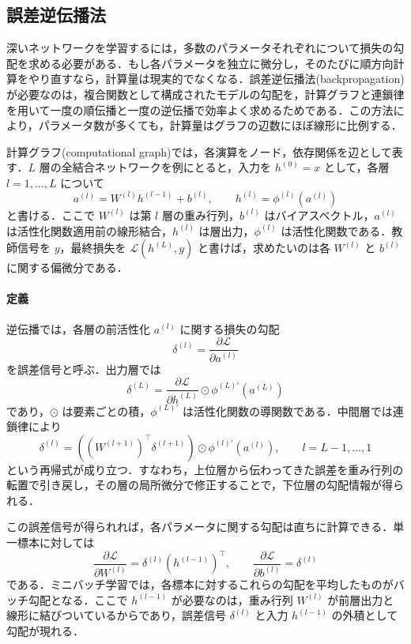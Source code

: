 \subsection{誤差逆伝播法}
深いネットワークを学習するには，多数のパラメータそれぞれについて損失の勾配を求める必要がある．もし各パラメータを独立に微分し，そのたびに順方向計算をやり直すなら，計算量は現実的でなくなる．誤差逆伝播法(backpropagation)\cite{Rumelhart1986}が必要なのは，複合関数として構成されたモデルの勾配を，計算グラフと連鎖律を用いて一度の順伝播と一度の逆伝播で効率よく求めるためである．この方法により，パラメータ数が多くても，計算量はグラフの辺数にほぼ線形に比例する．

計算グラフ(computational graph)では，各演算をノード，依存関係を辺として表す．$L$ 層の全結合ネットワークを例にとると，入力を $h^{(0)}=x$ として，各層 $l=1,\dots,L$ について
\begin{equation}
a^{(l)} = W^{(l)} h^{(l-1)} + b^{(l)},
\qquad
h^{(l)} = \phi^{(l)}(a^{(l)})
\end{equation}
と書ける．ここで $W^{(l)}$ は第 $l$ 層の重み行列，$b^{(l)}$ はバイアスベクトル，$a^{(l)}$ は活性化関数適用前の線形結合，$h^{(l)}$ は層出力，$\phi^{(l)}$ は活性化関数である．教師信号を $y$，最終損失を $\mathcal L(h^{(L)},y)$ と書けば，求めたいのは各 $W^{(l)}$ と $b^{(l)}$ に関する偏微分である．

\paragraph*{定義}
逆伝播では，各層の前活性化 $a^{(l)}$ に関する損失の勾配
\begin{equation}
\delta^{(l)} = \frac{\partial \mathcal L}{\partial a^{(l)}}
\end{equation}
を誤差信号と呼ぶ．出力層では
\begin{equation}
\delta^{(L)}
= \frac{\partial \mathcal L}{\partial h^{(L)}} \odot \phi^{(L)\prime}(a^{(L)})
\end{equation}
であり，$\odot$ は要素ごとの積，$\phi^{(L)\prime}$ は活性化関数の導関数である．中間層では連鎖律により
\begin{equation}
\delta^{(l)}
= \left((W^{(l+1)})^\top \delta^{(l+1)}\right)\odot \phi^{(l)\prime}(a^{(l)}),
\qquad l=L-1,\dots,1
\end{equation}
という再帰式が成り立つ．すなわち，上位層から伝わってきた誤差を重み行列の転置で引き戻し，その層の局所微分で修正することで，下位層の勾配情報が得られる．

この誤差信号が得られれば，各パラメータに関する勾配は直ちに計算できる．単一標本に対しては
\begin{equation}
\frac{\partial \mathcal L}{\partial W^{(l)}}
= \delta^{(l)}(h^{(l-1)})^\top,
\qquad
\frac{\partial \mathcal L}{\partial b^{(l)}}
= \delta^{(l)}
\end{equation}
である．ミニバッチ学習では，各標本に対するこれらの勾配を平均したものがバッチ勾配となる．ここで $h^{(l-1)}$ が必要なのは，重み行列 $W^{(l)}$ が前層出力と線形に結びついているからであり，誤差信号 $\delta^{(l)}$ と入力 $h^{(l-1)}$ の外積として勾配が現れる．


